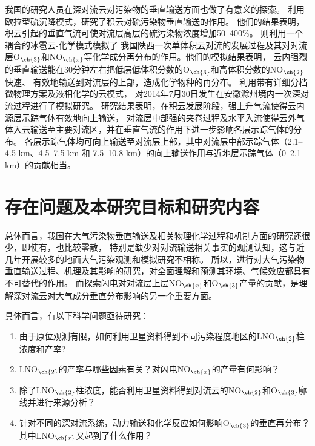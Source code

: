 我国的研究人员在深对流云对污染物的垂直输送方面也做了有意义的探索。
\citet{GaoHuiWang.1998}利用欧拉型硫沉降模式，研究了积云对硫污染物垂直输送的作用。
他们的结果表明，积云引起的垂直气流可使对流层高层的硫污染物浓度增加50--400\%。
\citet{LiBing.1999,LiBing.2001}则利用一个耦合的冰雹云-化学模式模拟了
我国陕西一次单体积云对流的发展过程及其对对流层O$_{\ch{3}}$和NO$_{\ch{x}}$等化学成分再分布的作用。他们的模拟结果表明，
云内强烈的垂直输送能在30分钟左右把低层低体积分数的O$_{\ch{3}}$和高体积分数的NO$_{\ch{2}}$快速、
有效地输送到对流层的上部，造成化学物种的再分布。
\citet{HuJiaYing.2019}利用带有详细分档微物理方案及液相化学的云模式，
对2014年7月30日发生在安徽滁州境内一次深对流过程进行了模拟研究。
研究结果表明，在积云发展阶段，强上升气流使得云内源层示踪气体有效地向上输送，
对流层中部强的夹卷过程及水平入流使得云外气体入云输送至主要对流区，并在垂直气流的作用下进一步影响各层示踪气体的分布。
各层示踪气体均可向上输送至对流层上部，其中对流层中部示踪气体（2.1--4.5 km、4.5--7.5 km 和 7.5--10.8 km）的向上输送作用与近地层示踪气体（0--2.1 km）的贡献相当。




\section{存在问题及本研究目标和研究内容}

总体而言，我国在大气污染物垂直输送及相关物理化学过程和机制方面的研究还很少，即使有，也比较零散，
特别是缺少对对流输送相关事实的观测认知，这与近几年开展较多的地面大气污染观测和模拟研究不相称。
所以，进行对大气污染物垂直输送过程、机理及其影响的研究，对全面理解和预测其环境、气候效应都具有不可替代的作用。
而探索闪电对对流层上层NO$_{\ch{x}}$和O$_{\ch{3}}$产量的贡献，是理解深对流云对大气成分垂直分布影响的另一个重要方面。

具体而言，有以下科学问题亟待研究：

\begin{enumerate}[label=（\arabic*）, labelindent=\parindent, nosep, leftmargin=0pt, widest=0, itemindent=*, topsep=0pt, partopsep=0pt, parsep=0pt]

\item 由于原位观测有限，如何利用卫星资料得到不同污染程度地区的LNO$_{\ch{2}}$柱浓度和产率?

\item LNO$_{\ch{2}}$的产率与哪些因素有关？对闪电NO$_{\ch{x}}$的产量有何影响？

\item 除了LNO$_{\ch{2}}$柱浓度，能否利用卫星资料得到对流云的NO$_{\ch{2}}$和O$_{\ch{3}}$廓线并进行来源分析？

\item 针对不同的深对流系统，动力输送和化学反应如何影响O$_{\ch{3}}$的垂直再分布？其中LNO$_{\ch{x}}$又起到了什么作用？

\end{enumerate}

